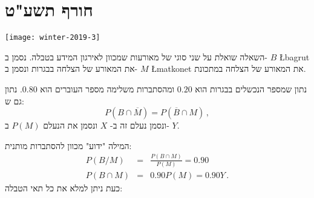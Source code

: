 
\newpage

\section{חורף תשע"ט}

\begin{center}
\texttt{[image: winter-2019-3]}
\end{center}

השאלה שואלת על שני סוגי של מאורעות שמכוון לאירגון המידע בטבלה. נסמן ב-%
$B$ \L{bagrut}
את המאורע של הצלחה בבגרות ונסמן ב-%
$M$ \L{matkonet}
את המאורע של הצלחה במתכונת.

נתון שמספר הנכשלים בבגרות הוא 
$0.20$
ומהסתברות משלימה מספר העוברים הוא
$0.80$.
נתון גם ש:
\[
P(B\cap\overline{M})=P(\overline{B}\cap M)\,,
\]
ונסמן נעלם זה ב-%
$X$
ונסמן את הנעלם
$P(M)$
ב-%
$Y$.

המילה "ידוע" מכוון להסתברות מותנית:
\begin{eqnarray*}
P(B/M)&=&\frac{P(B\cap M)}{P(M)}=0.90\\
P(B\cap M)&=&0.90 P(M)=0.90Y\,.
\end{eqnarray*}
כעת ניתן למלא את כל תאי הטבלה:
\begin{center}
\end{center}

